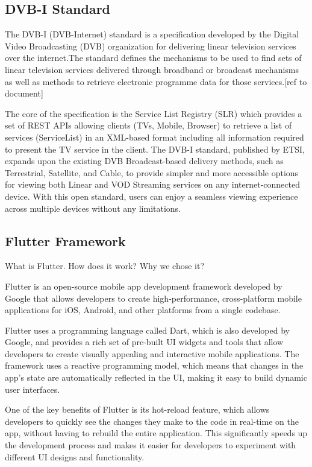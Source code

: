 \documentclass[conference]{IEEEtran}
\begin{document}
\subsection{DVB-I Standard}

The DVB-I (DVB-Internet) standard is a specification developed by the Digital Video Broadcasting (DVB) organization for delivering linear television services over the internet.The standard defines the mechanisms to be used to find sets of linear television services delivered through broadband or broadcast mechanisms as well as methods to retrieve electronic programme data for those services.[ref to document]

The core of the specification is the Service List Registry (SLR) which provides a set of REST APIs allowing clients (TVs, Mobile, Browser) to retrieve a list of services (ServiceList) in an XML-based format including all information required to present the TV service in the client. The DVB-I standard, published by ETSI, expands upon the existing DVB Broadcast-based delivery methods, such as Terrestrial, Satellite, and Cable, to provide simpler and more accessible options for viewing both Linear and VOD Streaming services on any internet-connected device. With this open standard, users can enjoy a seamless viewing experience across multiple devices without any limitations.





\subsection{Flutter Framework}\label{AA}

What is Flutter. How does it work? Why we chose it?

Flutter is an open-source mobile app development framework developed by Google that allows developers to create high-performance, cross-platform mobile applications for iOS, Android, and other platforms from a single codebase.

Flutter uses a programming language called Dart, which is also developed by Google, and provides a rich set of pre-built UI widgets and tools that allow developers to create visually appealing and interactive mobile applications. The framework uses a reactive programming model, which means that changes in the app's state are automatically reflected in the UI, making it easy to build dynamic user interfaces.

One of the key benefits of Flutter is its hot-reload feature, which allows developers to quickly see the changes they make to the code in real-time on the app, without having to rebuild the entire application. This significantly speeds up the development process and makes it easier for developers to experiment with different UI designs and functionality.
\end{document}
